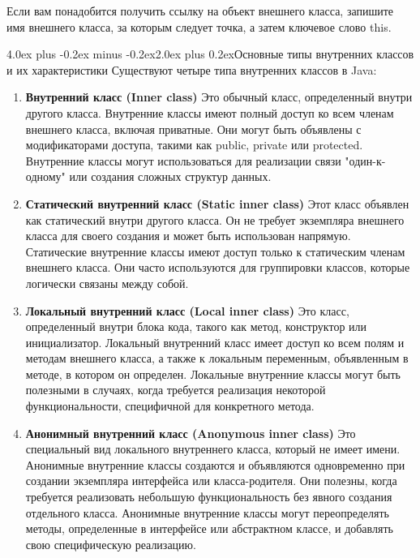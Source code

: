 \documentclass[12pt, a4paper]{book}%
\makeatletter
\renewcommand{\section}{\@startsection{section}{1}{1pt}%
{4.0ex plus -0.2ex minus -0.2ex}{2.0ex plus 0.2ex}{\centering\bf}}%
\makeatother
\begin{document}
{Если вам понадобится получить ссылку на объект внешнего класса, запишите имя внешнего класса, за которым следует точка, а затем ключевое слово this.

\section{Основные типы внутренних классов и их характеристики}
Существуют четыре типа внутренних классов в Java:

\begin{enumerate}
\item {\bf Внутренний класс (Inner class)}
Это обычный класс, определенный внутри другого класса. Внутренние классы имеют полный доступ ко всем членам внешнего класса, включая приватные. Они могут быть объявлены с модификаторами доступа, такими как public, private или protected. Внутренние классы могут использоваться для реализации связи "один-к-одному" или создания сложных структур данных.

\item {\bf Статический внутренний класс (Static inner class)}
 Этот класс объявлен как статический внутри другого класса. Он не требует экземпляра внешнего класса для своего создания и может быть использован напрямую. Статические внутренние классы имеют доступ только к статическим членам внешнего класса. Они часто используются для группировки классов, которые логически связаны между собой.

\item {\bf Локальный внутренний класс (Local inner class)}
Это класс, определенный внутри блока кода, такого как метод, конструктор или инициализатор. Локальный внутренний класс имеет доступ ко всем полям и методам внешнего класса, а также к локальным переменным, объявленным в методе, в котором он определен. Локальные внутренние классы могут быть полезными в случаях, когда требуется реализация некоторой функциональности, специфичной для конкретного метода.

\item {\bf Анонимный внутренний класс (Anonymous inner class)}
Это специальный вид локального внутреннего класса, который не имеет имени. Анонимные внутренние классы создаются и объявляются одновременно при создании экземпляра интерфейса или класса-родителя. Они полезны, когда требуется реализовать небольшую функциональность без явного создания отдельного класса. Анонимные внутренние классы могут переопределять методы, определенные в интерфейсе или абстрактном классе, и добавлять свою специфическую реализацию.
\end{enumerate}

}
\end{document}
